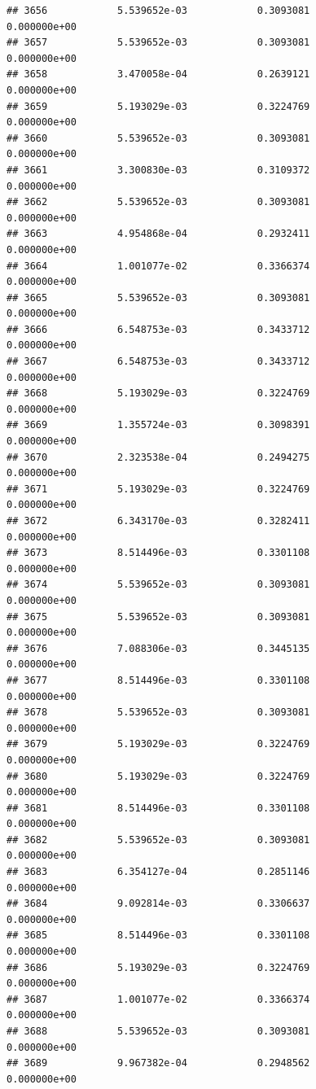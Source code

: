 \documentclass[
]{article}
\begin{document}
\begin{verbatim}
## 3656            5.539652e-03            0.3093081            0.000000e+00
## 3657            5.539652e-03            0.3093081            0.000000e+00
## 3658            3.470058e-04            0.2639121            0.000000e+00
## 3659            5.193029e-03            0.3224769            0.000000e+00
## 3660            5.539652e-03            0.3093081            0.000000e+00
## 3661            3.300830e-03            0.3109372            0.000000e+00
## 3662            5.539652e-03            0.3093081            0.000000e+00
## 3663            4.954868e-04            0.2932411            0.000000e+00
## 3664            1.001077e-02            0.3366374            0.000000e+00
## 3665            5.539652e-03            0.3093081            0.000000e+00
## 3666            6.548753e-03            0.3433712            0.000000e+00
## 3667            6.548753e-03            0.3433712            0.000000e+00
## 3668            5.193029e-03            0.3224769            0.000000e+00
## 3669            1.355724e-03            0.3098391            0.000000e+00
## 3670            2.323538e-04            0.2494275            0.000000e+00
## 3671            5.193029e-03            0.3224769            0.000000e+00
## 3672            6.343170e-03            0.3282411            0.000000e+00
## 3673            8.514496e-03            0.3301108            0.000000e+00
## 3674            5.539652e-03            0.3093081            0.000000e+00
## 3675            5.539652e-03            0.3093081            0.000000e+00
## 3676            7.088306e-03            0.3445135            0.000000e+00
## 3677            8.514496e-03            0.3301108            0.000000e+00
## 3678            5.539652e-03            0.3093081            0.000000e+00
## 3679            5.193029e-03            0.3224769            0.000000e+00
## 3680            5.193029e-03            0.3224769            0.000000e+00
## 3681            8.514496e-03            0.3301108            0.000000e+00
## 3682            5.539652e-03            0.3093081            0.000000e+00
## 3683            6.354127e-04            0.2851146            0.000000e+00
## 3684            9.092814e-03            0.3306637            0.000000e+00
## 3685            8.514496e-03            0.3301108            0.000000e+00
## 3686            5.193029e-03            0.3224769            0.000000e+00
## 3687            1.001077e-02            0.3366374            0.000000e+00
## 3688            5.539652e-03            0.3093081            0.000000e+00
## 3689            9.967382e-04            0.2948562            0.000000e+00

\end{verbatim}
\end{document}
